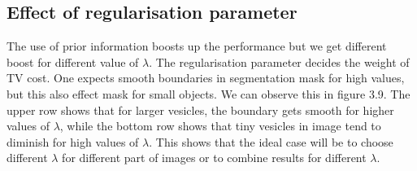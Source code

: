 \subsection{Effect of regularisation parameter}
The use of prior information boosts up the performance but we get different boost for different value of $\lambda$. The regularisation parameter decides the weight of TV cost. One expects smooth boundaries in segmentation mask for high values, but this also effect mask for small objects. We can observe this in figure 3.9. The upper row shows that for larger vesicles, the boundary gets smooth for higher values of $\lambda$, while the bottom row shows that tiny vesicles in image tend to diminish for high values of $\lambda$. This shows that the ideal case will be to choose different $\lambda$ for different part of images or to combine results for different $\lambda$. 
